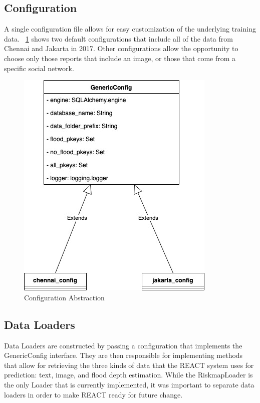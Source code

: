 \subsection{Configuration}
A single configuration file allows for easy customization of the underlying 
training data. \figureautorefname{}~\ref{fig:config} shows two default configurations 
that include all of the data from Chennai and Jakarta in 2017. Other 
configurations allow the opportunity to choose only those reports that 
include an image, or those that come from a specific social network.
\begin{figure}[ht]
    \centering
    \includegraphics[scale=0.6]{images/config.jpg}
    \caption{Configuration Abstraction}\label{fig:config}
\end{figure}

\subsection{Data Loaders}
Data Loaders are constructed by passing a configuration that implements the 
GenericConfig interface. They are then responsible for implementing methods 
that allow for retrieving the three kinds of data that the REACT system 
uses for prediction: text, image, and flood depth estimation. While the
RiskmapLoader is the only Loader that is currently implemented, it was 
important to separate data loaders in order to make REACT ready for future change.


